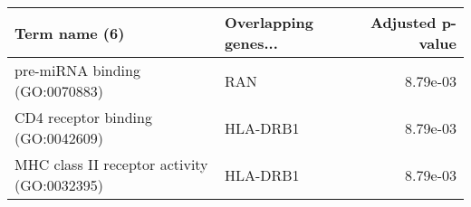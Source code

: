 \begin{tabular}{llr}
\toprule
                              Term name (6) & Overlapping genes... &  Adjusted p-value \\
\midrule
             pre-miRNA binding (GO:0070883) &                  RAN &          8.79e-03 \\
          CD4 receptor binding (GO:0042609) &             HLA-DRB1 &          8.79e-03 \\
MHC class II receptor activity (GO:0032395) &             HLA-DRB1 &          8.79e-03 \\
\bottomrule
\end{tabular}
